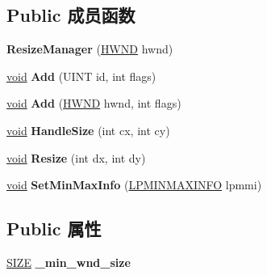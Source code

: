 \subsection*{Public 成员函数}
\begin{DoxyCompactItemize}
\item 
\mbox{\label{struct_resize_manager_ac0a39c55010813eeae6b20c1a0e1efed}} 
{\bfseries Resize\+Manager} (\hyperlink{interfacevoid}{H\+W\+ND} hwnd)
\item 
\mbox{\label{struct_resize_manager_a6f94a74e54b539d35ec5fa68d54a9ebb}} 
\hyperlink{interfacevoid}{void} {\bfseries Add} (U\+I\+NT id, int flags)
\item 
\mbox{\label{struct_resize_manager_a26875d4682c98b77ee7bb0e4b9f7a09f}} 
\hyperlink{interfacevoid}{void} {\bfseries Add} (\hyperlink{interfacevoid}{H\+W\+ND} hwnd, int flags)
\item 
\mbox{\label{struct_resize_manager_af82caec4839f9d044956e52aa45999d0}} 
\hyperlink{interfacevoid}{void} {\bfseries Handle\+Size} (int cx, int cy)
\item 
\mbox{\label{struct_resize_manager_a235bb167f633ef21c4bb87be1858c2fa}} 
\hyperlink{interfacevoid}{void} {\bfseries Resize} (int dx, int dy)
\item 
\mbox{\label{struct_resize_manager_a8d964087c3a1593e1ca3c14e8a7463ab}} 
\hyperlink{interfacevoid}{void} {\bfseries Set\+Min\+Max\+Info} (\hyperlink{structtag_m_i_n_m_a_x_i_n_f_o}{L\+P\+M\+I\+N\+M\+A\+X\+I\+N\+FO} lpmmi)
\end{DoxyCompactItemize}
\subsection*{Public 属性}
\begin{DoxyCompactItemize}
\item 
\mbox{\label{struct_resize_manager_aa95b2bcc39a88c3048beb1d3d841fbd3}} 
\hyperlink{structtag_s_i_z_e}{S\+I\+ZE} {\bfseries \+\_\+min\+\_\+wnd\+\_\+size}
\end{DoxyCompactItemize}
